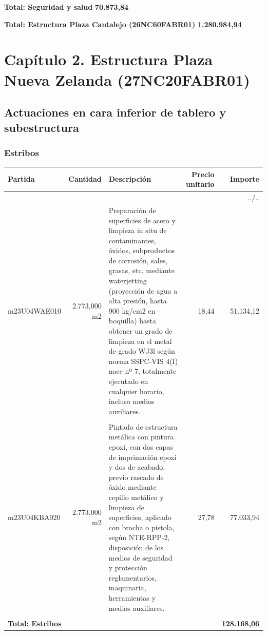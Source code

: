 \documentclass{book}%
\begin{document}
%
\noindent%
\large%
\textbf{Total: Seguridad y salud }%
\dotfill%
\textbf{70.873,84}%
\newline%
\normalsize

%
\noindent%
\large%
\textbf{Total: Estructura Plaza Cantalejo (26NC60FABR01) }%
\dotfill%
\textbf{1.280.984,94}%
\newline%
\normalsize

%
\chapter{Capítulo 2. Estructura Plaza Nueva Zelanda (27NC20FABR01)}%
\section{Actuaciones en cara inferior de tablero y subestructura}%
\subsection{Estribos}%
\small%
\begin{longtable}{lrlrr}%
Partida&Cantidad&Descripción&\multicolumn{1}{p{1.5cm}}{Precio unitario}&Importe\\%
\hline%
\endhead%
\multicolumn{5}{r}{../..}\\%
\endfoot%
\hline%
\endlastfoot%
m23U04WAE010& 2.773,000 m2&\multicolumn{1}{p{5cm}}{Preparación de superficies de acero y limpieza in situ de contaminantes, óxidos, subproductos de corrosión, sales, grasas, etc. mediante waterjetting (proyección de agua a alta presión, hasta 900 kg/cm2 en boquilla) hasta obtener un grado de limpieza en el metal de grado WJ3l según norma SSPC{-}VIS 4(I) nace nº 7, totalmente ejecutado en cualquier horario, incluso medios auxiliares.}&     18,44&51.134,12\\%
&&&&\\%
m23U04KBA020& 2.773,000 m2&\multicolumn{1}{p{5cm}}{Pintado de estructura metálica con pintura epoxi, con dos capas de imprimación epoxi y dos de acabado, previo rascado de óxido mediante cepillo metálico y limpieza de superficies, aplicado con brocha o pistola, según NTE{-}RPP{-}2, disposición de los medios de seguridad y protección reglamentarios, maquinaria, herramientas y medios auxiliares.}&     27,78&77.033,94\\%
&&&&\\%
\multicolumn{4}{p{8cm}}{\textbf{Total: Estribos}}&\textbf{128.168,06}\\%
\end{longtable}%
\normalsize
\end{document}
